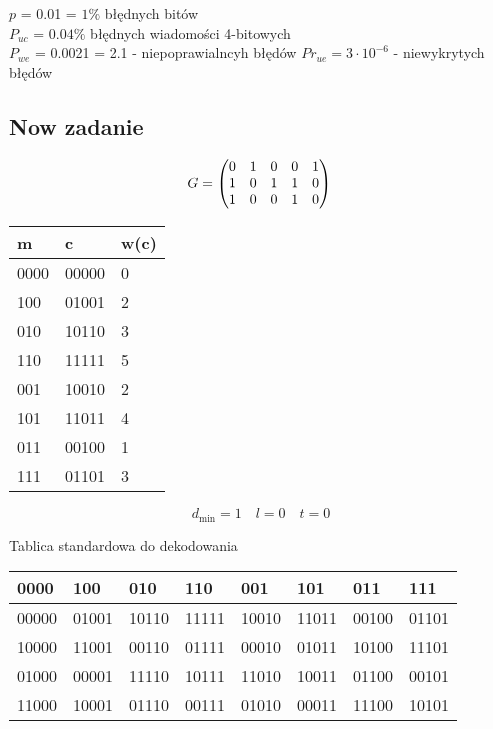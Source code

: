 \documentclass[12pt]{article}
\begin{document}
$p$ = 0.01 = $1\%$ błędnych bitów \\
$P_{uc}$ = $0.04\%$ błędnych wiadomości 4-bitowych \\
$P_{we}$ = 0.0021 = 2.1 \textperthousand - niepoprawialncyh błędów
$Pr_{ue} = 3 \cdot 10^{-6}$ - niewykrytych błędów

\subsection*{Now zadanie} 

$$
G=
 \begin{pmatrix}
    0 & 1 & 0 & 0 & 1 \\
    1 & 0 & 1 & 1 & 0 \\
    1 & 0 & 0 & 1 & 0 \\
\end{pmatrix} \\
$$


\begin{table}[h]
\begin{tabular}{|l|l|l|}
\hline
m    & c     & w(c) \\ \hline
0000 & 00000 & 0    \\ \hline
100  & 01001 & 2    \\ \hline
010  & 10110 & 3    \\ \hline
110  & 11111 & 5    \\ \hline
001  & 10010 & 2    \\ \hline
101  & 11011 & 4    \\ \hline
011  & 00100 & 1    \\ \hline
111  & 01101 & 3    \\ \hline
\end{tabular}
\end{table}
$$d_{\min} = 1 \quad l=0 \quad t=0 $$


Tablica standardowa do dekodowania

\begin{table}[h]
\begin{tabular}{llllllll}
0000  & 100   & 010   & 110   & 001   & 101   & 011   & 111   \\ \hline
00000 & 01001 & 10110 & 11111 & 10010 & 11011 & 00100 & 01101 \\
10000 & 11001 & 00110 & 01111 & 00010 & 01011 & 10100 & 11101 \\
01000 & 00001 & 11110 & 10111 & 11010 & 10011 & 01100 & 00101 \\
11000 & 10001 & 01110 & 00111 & 01010 & 00011 & 11100 & 10101
\end{tabular}
\end{table}
\end{document}
